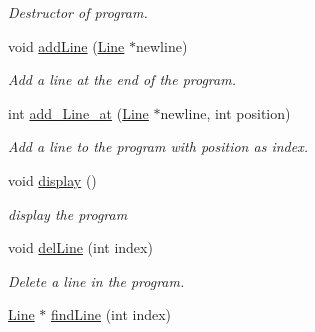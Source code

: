 \begin{DoxyCompactItemize}
\begin{DoxyCompactList}\small\item\em Destructor of program. \item\end{DoxyCompactList}\item 
\hypertarget{classProgram_a3f0df57e5b726978cc2194c94cc76d18}{
void \hyperlink{classProgram_a3f0df57e5b726978cc2194c94cc76d18}{addLine} (\hyperlink{classLine}{Line} $\ast$newline)}
\label{classProgram_a3f0df57e5b726978cc2194c94cc76d18}

\begin{DoxyCompactList}\small\item\em Add a line at the end of the program. \item\end{DoxyCompactList}\item 
\hypertarget{classProgram_aea3d46bd7c1908ce9b253f0140345eaa}{
int \hyperlink{classProgram_aea3d46bd7c1908ce9b253f0140345eaa}{add\_\-Line\_\-at} (\hyperlink{classLine}{Line} $\ast$newline, int position)}
\label{classProgram_aea3d46bd7c1908ce9b253f0140345eaa}

\begin{DoxyCompactList}\small\item\em Add a line to the program with position as index. \item\end{DoxyCompactList}\item 
\hypertarget{classProgram_a3c1399ac5ed69e5c152f1a2cc1e644d4}{
void \hyperlink{classProgram_a3c1399ac5ed69e5c152f1a2cc1e644d4}{display} ()}
\label{classProgram_a3c1399ac5ed69e5c152f1a2cc1e644d4}

\begin{DoxyCompactList}\small\item\em display the program \item\end{DoxyCompactList}\item 
\hypertarget{classProgram_a08dffa0f779f1ce089649c73d5e44498}{
void \hyperlink{classProgram_a08dffa0f779f1ce089649c73d5e44498}{delLine} (int index)}
\label{classProgram_a08dffa0f779f1ce089649c73d5e44498}

\begin{DoxyCompactList}\small\item\em Delete a line in the program. \item\end{DoxyCompactList}\item 
\hypertarget{classProgram_a8f37b171319c0e4a746b4822e4115d23}{
\hyperlink{classLine}{Line} $\ast$ \hyperlink{classProgram_a8f37b171319c0e4a746b4822e4115d23}{findLine} (int index)}
\label{classProgram_a8f37b171319c0e4a746b4822e4115d23}


\end{DoxyCompactItemize}
